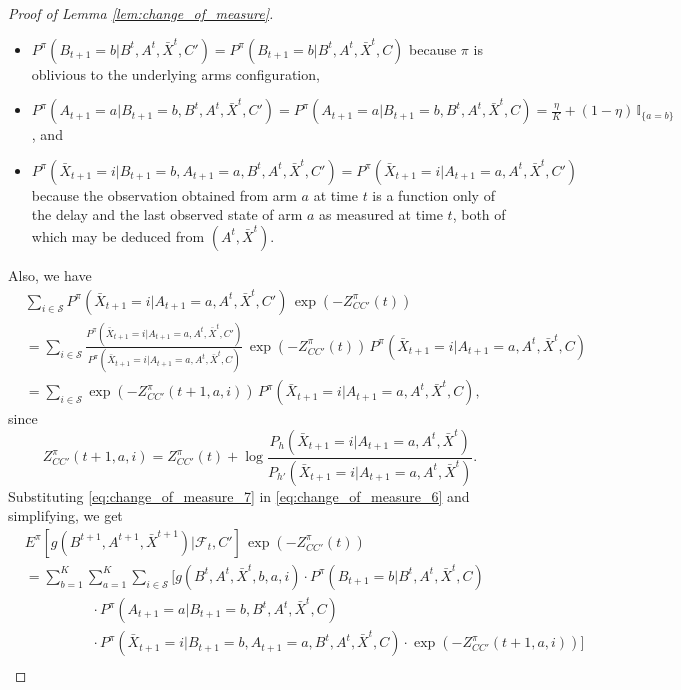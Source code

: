 \begin{proof}[Proof of Lemma \ref{lem:change_of_measure}]
	\begin{itemize}
		\item $P^\pi(B_{t+1}=b|B^t,A^t,\bar{X}^t,C')=P^\pi(B_{t+1}=b|B^t,A^t,\bar{X}^t,C)$ because $\pi$ is oblivious to the underlying arms configuration,
		\item $P^\pi(A_{t+1}=a|B_{t+1}=b,B^t,A^t,\bar{X}^t,C')=P^\pi(A_{t+1}=a|B_{t+1}=b,B^t,A^t,\bar{X}^t,C)=\frac{\eta}{K}+(1-\eta)\,\mathbb{I}_{\{a=b\}}$, and
		\item $P^\pi(\bar{X}_{t+1}=i|B_{t+1}=b,A_{t+1}=a,B^t,A^t,\bar{X}^t,C')=P^\pi(\bar{X}_{t+1}=i|A_{t+1}=a,A^t,\bar{X}^t,C')$ because the observation obtained from arm $a$ at time $t$ is a function only of the delay and the last observed state of arm $a$ as measured at time $t$, both of which may be deduced from $(A^t, \bar{X}^t)$.
	\end{itemize}
	Also, we have
	\begingroup \allowdisplaybreaks\begin{align}
		& \sum\limits_{i\in\mathcal{S}}P^\pi(\bar{X}_{t+1}=i|A_{t+1}=a,A^t,\bar{X}^t,C')\,\exp(-Z^\pi_{CC'}(t))\nonumber\\
		&=\sum\limits_{i\in\mathcal{S}}\frac{P^\pi(\bar{X}_{t+1}=i|A_{t+1}=a,A^t,\bar{X}^t, C')}{P^\pi(\bar{X}_{t+1}=i|A_{t+1}=a,A^t,\bar{X}^t, C)}\,\exp(-Z^\pi_{CC'}(t))\,P^\pi(\bar{X}_{t+1}=i|A_{t+1}=a,A^t,\bar{X}^t,C)\nonumber\\
		&=\sum\limits_{i\in\mathcal{S}}\exp(-Z^\pi_{CC'}(t+1,a,i))\,P^\pi(\bar{X}_{t+1}=i|A_{t+1}=a,A^t,\bar{X}^t,C),\label{eq:change_of_measure_7}
	\end{align}\endgroup
	since $$Z^\pi_{CC'}(t+1,a,i)= Z^\pi_{CC'}(t)+\log\frac{P_h(\bar{X}_{t+1}=i|A_{t+1}=a,A^t,\bar{X}^t)}{P_{h'}(\bar{X}_{t+1}=i|A_{t+1}=a,A^t,\bar{X}^t)}.$$
	Substituting \eqref{eq:change_of_measure_7} in \eqref{eq:change_of_measure_6} and simplifying, we get
	\begingroup \allowdisplaybreaks\begin{align}
		& E^\pi[g(B^{t+1},A^{t+1},\bar{X}^{t+1})|\mathcal{F}_t,C']\,\exp(-Z^\pi_{CC'}(t))\nonumber\\
		&=\sum\limits_{b=1}^{K}\sum\limits_{a=1}^{K}\sum\limits_{i\in\mathcal{S}} \bigg[g(B^t,A^t,\bar{X}^t, b, a, i)\cdot P^\pi(B_{t+1}=b|B^t,A^t,\bar{X}^t,C)\nonumber\\
		&\hspace{2cm}\cdot P^\pi(A_{t+1}=a|B_{t+1}=b,B^t,A^t,\bar{X}^t,C)\nonumber\\
		&\hspace{2cm}\cdot P^\pi(\bar{X}_{t+1}=i|B_{t+1}=b,A_{t+1}=a,B^t,A^t,\bar{X}^t,C)\cdot \exp(-Z^\pi_{CC'}(t+1,a,i))\bigg]\\

\end{align}
\end{proof}
